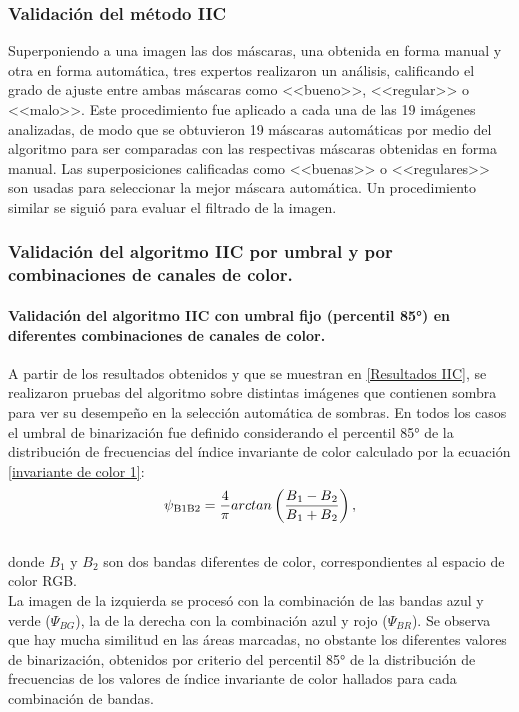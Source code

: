 \subsubsection{Validación del método IIC} \label{Validacion}
Superponiendo a una imagen las dos máscaras, una obtenida en forma manual y otra en forma automática, tres expertos realizaron un análisis, calificando el grado de ajuste entre ambas máscaras como <<bueno>>, <<regular>> o <<malo>>. Este procedimiento fue aplicado a cada una de las 19 imágenes analizadas, de modo que se obtuvieron 19 máscaras automáticas por medio del algoritmo para ser comparadas con las respectivas máscaras obtenidas en forma manual. Las superposiciones calificadas como <<buenas>> o <<regulares>> son usadas para seleccionar la mejor máscara automática. Un procedimiento similar se siguió para evaluar el filtrado de la imagen.

\subsubsection{Validación del algoritmo IIC por umbral y por combinaciones de canales de color.} %
\paragraph{Validación del algoritmo IIC con umbral fijo (percentil 85°) en diferentes combinaciones de canales de color.}
A partir de los resultados obtenidos y que se muestran en \ref{Resultados IIC}, se realizaron pruebas del algoritmo sobre distintas imágenes que contienen sombra para ver su desempeño en la selección automática de sombras. En todos los casos el umbral de binarización fue definido considerando el percentil 85° de la distribución de frecuencias del índice invariante de color calculado por la ecuación \ref{invariante de color 1}:
\\
\begin{equation}
	\psi\textsubscript{B1B2}=\frac{4}{\pi} arctan\left(\frac{B\textsubscript{1}-B\textsubscript{2}}{B\textsubscript{1}+B\textsubscript{2}}\right),\label{invariante de color 1}
\end{equation}
\\
donde $B_1$ y $B_2$ son dos bandas diferentes de color, correspondientes al espacio de color RGB.
\\
La imagen de la izquierda se procesó con la combinación de las bandas azul y verde ($\Psi_{BG}$), la de la derecha con la combinación azul y rojo ($\Psi_{BR}$).
Se observa que hay mucha similitud en las áreas marcadas, no obstante los diferentes valores de binarización, obtenidos por criterio del percentil 85° de la distribución de frecuencias de los valores de índice invariante de color hallados para cada combinación de bandas.
\\
\\
